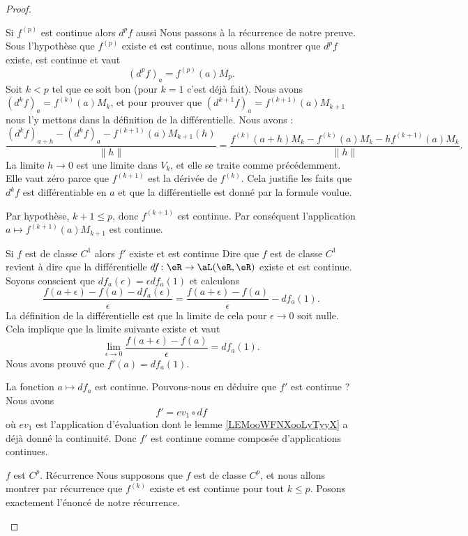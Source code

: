 \begin{proof}
\begin{subproof}
    \item[Si \( f^{(p)}\) est continue alors \( d^pf\) aussi]
        Nous passons à la récurrence de notre preuve. Sous l'hypothèse que \( f^{(p)}\) existe et est continue, nous allons montrer que \( d^pf\) existe, est continue et vaut
        \begin{equation}
            (d^pf)_a=f^{(p)}(a)M_p.
        \end{equation}
        Soit \( k<p\) tel que ce soit bon (pour \( k=1\) c'est déjà fait). Nous avons \( (d^kf)_a=f^{(k)}(a)M_k\), et pour prouver que \( (d^{k+1}f)_a=f^{(k+1)}(a)M_{k+1}\) nous l'y mettons dans la définition de la différentielle. Nous avons :
        \begin{equation}
            \frac{ (d^kf)_{a+h}-(d^kf)_a-f^{(k+1)}(a)M_{k+1}(h) }{ \| h \| }=\frac{ f^{(k)}(a+h)M_k-f^{(k)}(a)M_k-hf^{(k+1)}(a)M_k }{ \| h \| }.
        \end{equation}
        La limite \( h\to 0\) est une limite dans \( V_k\), et elle se traite comme précédemment. Elle vaut zéro parce que \( f^{(k+1)}\) est la dérivée de \( f^{(k)}\). Cela justifie les faits que \( d^kf\) est différentiable en \( a\) et que la différentielle est donné par la formule voulue.

        Par hypothèse, \( k+1\leq p\), donc \( f^{(k+1)}\) est continue. Par conséquent l'application \( a\mapsto f^{(k+1)}(a)M_{k+1}\) est continue.

    \item[Si \( f\) est de classe \( C^1\) alors \( f'\) existe et est continue]
        Dire que \( f\) est de classe \( C^1\) revient à dire que la différentielle \( df\colon \eR\to \aL(\eR,\eR)\) existe et est continue. Soyons conscient que \( df_a(\epsilon)=\epsilon df_a(1)\) et calculons
        \begin{equation}
            \frac{ f(a+\epsilon)-f(a)-df_a(\epsilon) }{ \epsilon }=\frac{ f(a+\epsilon)-f(a) }{ \epsilon }-df_a(1).
        \end{equation}
        La définition de la différentielle est que la limite de cela pour \( \epsilon\to 0\) soit nulle. Cela implique que la limite suivante existe et vaut
        \begin{equation}
            \lim_{\epsilon\to 0}\frac{ f(a+\epsilon)-f(a) }{ \epsilon }=df_a(1).
        \end{equation}
        Nous avons prouvé que \( f'(a)=df_a(1)\).

        La fonction \( a\mapsto df_a\) est continue. Pouvons-nous en déduire que \( f'\) est continue ? Nous avons
        \begin{equation}
            f'=ev_1\circ df
        \end{equation}
        où \( ev_1\) est l'application d'évaluation dont le lemme \ref{LEMooWFNXooLyTyyX} a déjà donné la continuité. Donc \( f'\) est continue comme composée d'applications continues.
    \item[\( f\) est \( C^p\). Récurrence]
        Nous supposons que \( f\) est de classe \( C^p\), et nous allons montrer par récurrence que \( f^{(k)}\) existe et est continue pour tout \( k\leq p\). Posons exactement l'énoncé de notre récurrence.


\end{subproof}
\end{proof}
